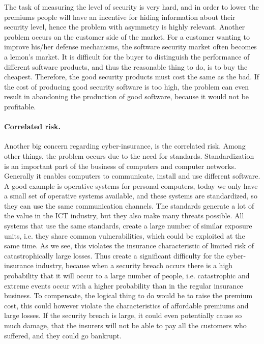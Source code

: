 The task of measuring the level of security is very hard, and in order to lower the premiums people will have an incentive for hiding information about their security level, hence the problem with asymmetry is highly relevant. Another problem occurs on the customer side of the market. For a customer wanting to improve his/her defense mechanisms, the software security market often becomes a lemon's market. It is difficult for the buyer to distinguish the performance of different software products, and thus the reasonable thing to do, is to buy the cheapest. Therefore, the good security products must cost the same as the bad. If the cost of producing good security software is too high, the problem can even result in abandoning the production of good software, because it would not be profitable.
      
\paragraph{Correlated risk.}

Another big concern regarding cyber-insurance, is the correlated risk. Among other things, the problem occurs due to the need for standards. Standardization is an important part of the business of computers and computer networks. Generally it enables computers to communicate, install and use different software. A good example is operative systems for personal computers, today we only have a small set of operative systems available, and these systems are standardized, so they can use the same communication channels. The standards generate a lot of the value in the ICT industry, but they also make many threats possible. All systems that use the same standards, create a large number of similar exposure units, i.e. they share common vulnerabilities, which could be exploited at the same time. As we see, this violates the insurance characteristic of limited risk of catastrophically large losses.  
Thus create a significant difficulty for the cyber-insurance industry, because when a security breach occurs there is a high probability that it will occur to a large number of people, i.e. catastrophic and extreme events occur with a higher probability than in the regular insurance business. To compensate, the logical thing to do would be to raise the premium cost, this could however violate the characteristics of affordable premiums and large losses. 
If the security breach is large, it could even potentially cause so much damage, that the insurers will not be able to pay all the customers who suffered, and they could go bankrupt.
 
